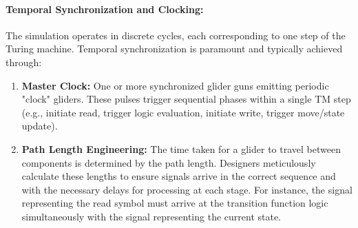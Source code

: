 \documentclass{article}
\theoremstyle{definition}
\theoremstyle{plain}
\theoremstyle{plain}
\begin{document}
\paragraph{Temporal Synchronization and Clocking:}
The simulation operates in discrete cycles, each corresponding to one step of the Turing machine. Temporal synchronization is paramount and typically achieved through:
\begin{enumerate}
  \item \textbf{Master Clock:} One or more synchronized glider guns emitting periodic "clock" gliders. These pulses trigger sequential phases within a single TM step (e.g., initiate read, trigger logic evaluation, initiate write, trigger move/state update).
  \item \textbf{Path Length Engineering:} The time taken for a glider to travel between components is determined by the path length. Designers meticulously calculate these lengths to ensure signals arrive in the correct sequence and with the necessary delays for processing at each stage. For instance, the signal representing the read symbol must arrive at the transition function logic simultaneously with the signal representing the current state.
\end{enumerate}
\end{document}

